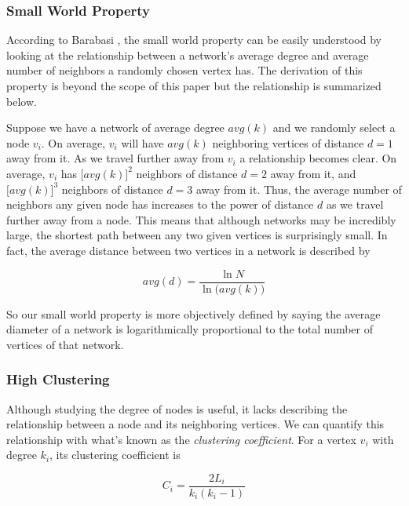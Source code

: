 \documentclass{article}
\begin{document}

\subsubsection{Small World Property}
According to Barabasi \cite{ns}, the small world property can be easily understood by looking at the relationship between a network's average degree and average number of neighbors a randomly chosen vertex has.  The derivation of this property is beyond the scope of this paper but the relationship is summarized below.   

Suppose we have a network of average degree $avg(k)$ and we randomly select a node $v_i$.   On average, $v_i$ will have $avg(k)$ neighboring vertices of distance $d=1$ away from it.  As we travel further away from $v_i$ a relationship becomes clear.  On average, $v_i$ has $\big[ avg(k) \big]^2$ neighbors of distance $d=2$ away from it, and $\big[ avg(k) \big]^3$ neighbors of distance $d=3$ away from it.  Thus, the average number of neighbors any given node has increases to the power of distance $d$ as we travel further away from a node.  This means that although networks may be incredibly large, the shortest path between any two given vertices is surprisingly small.  In fact, the average distance between two vertices in a network is described by

\begin{equation}
    avg(d) = \frac{\ln N}{\ln \big(avg(k)\big)}
\end{equation}

\vspace{0.4cm}

So our small world property is more objectively defined by saying the average diameter of a network is logarithmically proportional to the total number of vertices of that network.

\subsubsection{High Clustering}
Although studying the degree of nodes is useful, it lacks describing the relationship between a node and its neighboring vertices.  We can quantify this relationship with what's known as the \textit{clustering coefficient}.  For a vertex $v_i$ with degree $k_i$, its clustering coefficient is

\begin{equation}
    C_i = \frac{2 L_i}{k_i (k_i - 1)}
\end{equation}
\end{document}
